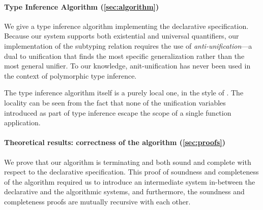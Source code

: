 \paragraph{Type Inference Algorithm (\cref{sec:algorithm})} We give a type
  inference algorithm implementing the declarative specification. Because our
  system supports both existential and universal quantifiers, our implementation
  of the subtyping relation requires the use of \emph{anti-unification}---a dual
  to unification that finds the most specific generalization rather than the
  most general unifier. To our knowledge, anit-unification has never been used
  in the context of polymorphic type inference.

  The type inference algorithm itself is a purely local one, in the style of
  \citet{pierce2000:local}. The locality can be seen from the fact that 
  none of the unification variables introduced as part of type inference
  escape the scope of a single function application.

\paragraph{Theoretical results: correctness of the algorithm (\cref{sec:proofs})}
  We prove that our algorithm is terminating and both sound and complete with
  respect to the declarative specification. This proof of soundness and completeness
  of the algorithm required us to introduce an intermediate system in-between
  the declarative and the algorithmic systems, and furthermore, the
  soundness and completeness proofs are mutually recursive with each other.
  
  

